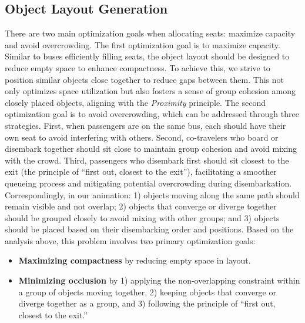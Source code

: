 \subsection{Object Layout Generation}
\label{sec:formulation2}
There are two main optimization goals when allocating seats: maximize capacity and avoid overcrowding.
The first optimization goal is to maximize capacity.
Similar to buses efficiently filling seats, the object layout should be designed to reduce empty space to enhance compactness.
To achieve this, we strive to position similar objects close together to reduce gaps between them.  
This not only optimizes space utilization but also fosters a sense of group cohesion among closely placed objects, aligning with the \textit{Proximity} principle.
The second optimization goal is to avoid overcrowding, which can be addressed through three strategies.
First, when passengers are on the same bus, each should have their own seat to avoid interfering with others.
Second, co-travelers who board or disembark together should sit close to maintain group cohesion and avoid mixing with the crowd.
Third, passengers who disembark first should sit closest to the exit (the principle of ``first out, closest to the exit''), facilitating a smoother queueing process and mitigating potential overcrowding during disembarkation.
Correspondingly, in our animation: 1) objects moving along the same path should remain visible and not overlap; 2) objects that converge or diverge together should be grouped closely to avoid mixing with other groups;
and 
3) objects should be placed based on their disembarking order and positions.
Based on the analysis above, this problem involves two primary optimization goals: 
\begin{itemize}
[itemsep=2pt,topsep=0pt,parsep=0pt]
    \item \textbf{Maximizing compactness} by reducing empty space in layout.
    \item \textbf{Minimizing occlusion} by 1) applying the non-overlapping constraint within a group of objects moving together, 2) keeping objects that converge or diverge together as a group, and 3) following the principle of ``first out, closest to the exit.''
\end{itemize}




